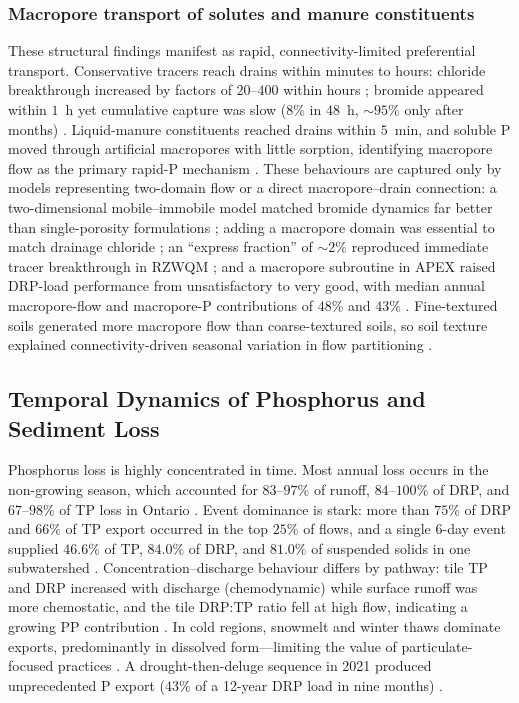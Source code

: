\documentclass[11pt]{article}
\begin{document}
\subsubsection{Macropore transport of solutes and manure constituents}

These structural findings manifest as rapid, connectivity-limited preferential
transport. Conservative tracers reach drains within minutes to hours: chloride
breakthrough increased by factors of $20$--$400$ within hours
\parencite{Villholth1998}; bromide appeared within $1$~h yet cumulative
capture was slow ($8\%$ in $48$~h, $\sim95\%$ only after months)
\parencite{Frey2012,Kladivko2023}. Liquid-manure constituents reached drains
within $5$~min, and soluble P moved through artificial macropores with little
sorption, identifying macropore flow as the primary rapid-P mechanism
\parencite{Stamm2002,Geohring2001}. These behaviours are captured only by
models representing two-domain flow or a direct macropore--drain connection: a
two-dimensional mobile--immobile model matched bromide dynamics far better than
single-porosity formulations \parencite{Köhne2006}; adding a macropore domain
was essential to match drainage chloride \parencite{Villholth1998b}; an
``express fraction'' of $\sim2\%$ reproduced immediate tracer breakthrough in
RZWQM \parencite{Fox2004,Fox2007b}; and a macropore subroutine in APEX raised
DRP-load performance from unsatisfactory to very good, with median annual
macropore-flow and macropore-P contributions of $48\%$ and $43\%$
\parencite{Ford2017}. Fine-textured soils generated more macropore flow than
coarse-textured soils, so soil texture explained connectivity-driven seasonal
variation in flow partitioning \parencite{Poon2021,Holbak2021}.

\subsection{Temporal Dynamics of Phosphorus and Sediment Loss}

Phosphorus loss is highly concentrated in time. Most annual loss occurs in the
non-growing season, which accounted for $83$--$97\%$ of runoff, $84$--$100\%$
of DRP, and $67$--$98\%$ of TP loss in Ontario
\parencite{VanEsbroeck2016,Qi2018}. Event dominance is stark: more than $75\%$
of DRP and $66\%$ of TP export occurred in the top $25\%$ of flows, and a
single 6-day event supplied $46.6\%$ of TP, $84.0\%$ of DRP, and $81.0\%$ of
suspended solids in one subwatershed \parencite{Brendel2019}.
Concentration--discharge behaviour differs by pathway: tile TP and DRP
increased with discharge (chemodynamic) while surface runoff was more
chemostatic, and the tile DRP:TP ratio fell at high flow, indicating a growing
PP contribution \parencite{Osterholz2020}. In cold regions, snowmelt and
winter thaws dominate exports, predominantly in dissolved form---limiting the
value of particulate-focused practices \parencite{Baulch2019,Clement2017}. A
drought-then-deluge sequence in 2021 produced unprecedented P export ($43\%$
of a 12-year DRP load in nine months) \parencite{Millar2025,Mumbi2025b}.
\end{document}

